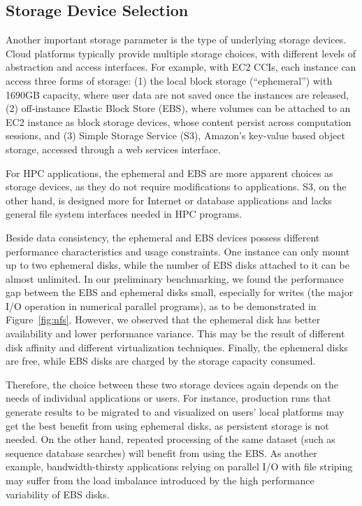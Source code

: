     \subsection{Storage Device Selection}
    Another important storage parameter is the type of underlying storage
    devices.  Cloud platforms typically provide multiple storage choices, with
    different levels of abstraction and access interfaces. For example, with
    EC2 CCIs, each instance can access three forms of storage: (1) the local
    block storage (``ephemeral'') with 1690GB capacity, where user data are
    not saved once the instances are released, (2) off-instance Elastic Block
    Store (EBS), where volumes can be attached to an EC2 instance as block
    storage devices, whose content persist across computation sessions, and
    (3) Simple Storage Service (S3), Amazon's key-value based object storage,
    accessed through a web services interface.

    For HPC applications, the ephemeral and EBS are more apparent choices as
    storage devices, as they do not require modifications to applications.
    S3, on the other hand, is designed more for Internet or database
    applications and lacks general file system interfaces needed in HPC
    programs.

    Beside data consistency, the ephemeral and EBS devices possess different
    performance characteristics and usage constraints. One instance can only
    mount up to two ephemeral disks, while the number of EBS disks attached
    to it can be almost unlimited.  In our preliminary benchmarking,
    we found the performance gap between the EBS and ephemeral disks 
    small, especially for writes (the major I/O operation in numerical
    parallel programs), as to be demonstrated in Figure~\ref{fig:nfs}.
    However, we observed that the ephemeral disk has better availability and
    lower performance variance. This may be the result of different disk
    affinity and different virtualization techniques. Finally, the ephemeral
    disks are free, while EBS disks are charged by the storage capacity
    consumed.

    Therefore, the choice between these two storage devices again depends on
    the needs of individual applications or users. For instance, production
    runs that generate results to be migrated to and visualized on users' local
    platforms may get the best benefit from using ephemeral disks, as
    persistent storage is not needed. On the other hand, repeated processing
    of the same dataset (such as sequence database searches) will benefit from
    using the EBS. As another example, bandwidth-thirsty applications relying
    on parallel I/O with file striping may suffer from the load imbalance
    introduced by the high performance variability of EBS disks.

